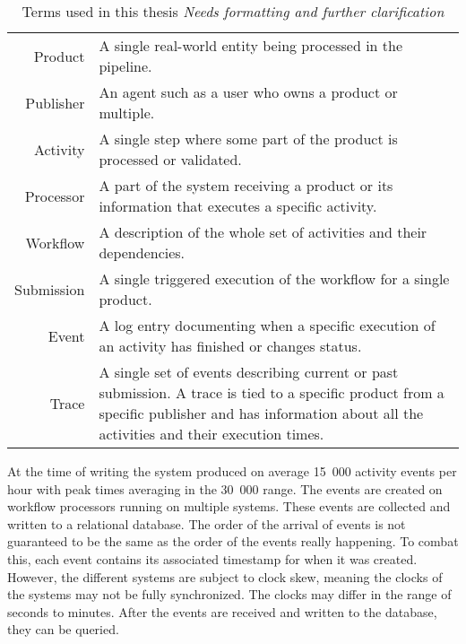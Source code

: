 \documentclass[english,12pt,a4paper,pdftex,sci,utf8]{aaltothesis}
\newcommand{\nyi}[1]{\colorbox{nyibg}{\textcolor{nyitext}{\emph{#1}}}}
\begin{document}
\begin{table}[htb]
\begin{center}
\begin{tabularx}{\linewidth}{r | X}
Product   & A single real-world entity being processed in the pipeline. \\
Publisher & An agent such as a user who owns a product or multiple. \\
Activity  & A single step where some part of the product is processed or validated. \\
Processor & A part of the system receiving a product or its information that executes a specific activity. \\
Workflow  & A description of the whole set of activities and their dependencies. \\ 
Submission & A single triggered execution of the workflow for a single product.\\
Event     & A log entry documenting when a specific execution of an activity has finished or changes status. \\
Trace     & A single set of events describing current or past submission. 
            A trace is tied to a specific product from a specific publisher and has information about all 
            the activities and their execution times. \\
\end{tabularx}
\end{center}
\caption{Terms used in this thesis \nyi{Needs formatting and further clarification}}
\label{tab:termdefinitions}
\end{table}

At the time of writing the system produced on average 15~000 activity events per hour with peak times averaging in the 30~000 range. The events are created on workflow processors running on multiple systems. These events are collected and written to a relational database. 
The order of the arrival of events is not guaranteed to be the same as the order of the events really happening.
To combat this, each event contains its associated timestamp for when it was created. However, the different systems are
subject to clock skew, meaning the clocks of the systems may not be fully synchronized. 
The clocks may differ in the range of seconds to minutes.
After the events are received and written to the database, they can be queried.
\end{document}
